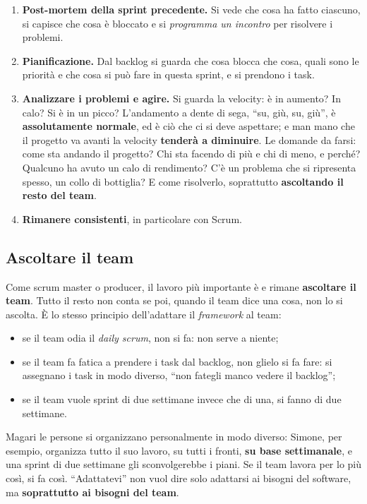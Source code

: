 \begin{enumerate}
  \item \textbf{Post-mortem della sprint precedente.} Si vede che cosa ha
        fatto ciascuno, si capisce che cosa è bloccato e si
        \emph{programma un incontro} per risolvere i problemi.
  \item \textbf{Pianificazione.} Dal backlog si guarda che cosa blocca che
        cosa, quali sono le priorità e che cosa si può fare in questa sprint,
        e si prendono i task.
  \item \textbf{Analizzare i problemi e agire.} Si guarda la velocity: è in
        aumento? In calo? Si è in un picco? L'andamento a dente di sega,
        ``su, giù, su, giù'', è \textbf{assolutamente normale}, ed è ciò che
        ci si deve aspettare; e man mano che il progetto va avanti la
        velocity \textbf{tenderà a diminuire}. Le domande da farsi: come sta
        andando il progetto? Chi sta facendo di più e chi di meno, e perché?
        Qualcuno ha avuto un calo di rendimento? C'è un problema che si
        ripresenta spesso, un collo di bottiglia? E come risolverlo,
        soprattutto \textbf{ascoltando il resto del team}.
  \item \textbf{Rimanere consistenti}, in particolare con Scrum.
\end{enumerate}

\subsection{Ascoltare il team}

Come scrum master o producer, il lavoro più importante è e rimane
\textbf{ascoltare il team}. Tutto il resto non conta se poi, quando il team
dice una cosa, non lo si ascolta. È lo stesso principio dell'adattare il
\emph{framework} al team:
\begin{itemize}
  \item se il team odia il \emph{daily scrum}, non si fa: non serve a niente;
  \item se il team fa fatica a prendere i task dal backlog, non glielo si fa
        fare: si assegnano i task in modo diverso, ``non fategli manco vedere
        il backlog'';
  \item se il team vuole sprint di due settimane invece che di una, si fanno
        di due settimane.
\end{itemize}
Magari le persone si organizzano personalmente in modo diverso: Simone, per
esempio, organizza tutto il suo lavoro, su tutti i fronti, \textbf{su base
settimanale}, e una sprint di due settimane gli sconvolgerebbe i piani. Se il
team lavora per lo più così, si fa così. ``Adattatevi'' non vuol dire solo
adattarsi ai bisogni del software, ma \textbf{soprattutto ai bisogni del
team}.

